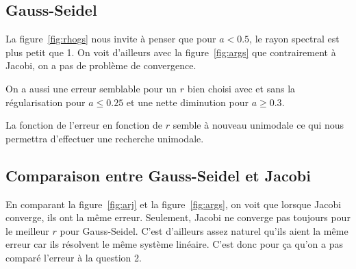 \subsection{Gauss-Seidel}
La figure~\ref{fig:rhogs} nous invite à penser que pour
$a < 0.5$, le rayon spectral est plus petit que 1.
On voit d'ailleurs avec la figure~\ref{fig:args} que contrairement
à Jacobi, on a pas de problème de convergence.

On a aussi une erreur semblable pour un $r$ bien choisi
avec et sans la régularisation pour $a \leq 0.25$ et une nette
diminution pour $a \geq 0.3$.

La fonction de l'erreur en fonction de $r$ semble à nouveau unimodale
ce qui nous permettra d'effectuer une recherche unimodale.

\subsection{Comparaison entre Gauss-Seidel et Jacobi}
En comparant la figure~\ref{fig:arj} et la figure~\ref{fig:args}, on voit
que lorsque Jacobi converge, ils ont la même erreur.
Seulement, Jacobi ne converge pas toujours pour le meilleur $r$ pour Gauss-Seidel.
C'est d'ailleurs assez naturel qu'ils aient la même erreur car ils résolvent le même
système linéaire.
C'est donc pour ça qu'on a pas comparé l'erreur à la question 2.


